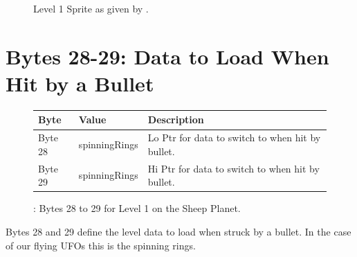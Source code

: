 \begin{figure}[H]
  {
    \setlength{\tabcolsep}{3.0pt}
    \setlength\cmidrulewidth{\heavyrulewidth} %
	\centering
	\def\MULTICOLORONE{white}
	\def\MULTICOLORTWO{red}
	\def\SPRITECOLOR{c64_purple}
	\begin{subfigure}{0.3\textwidth}
		
	\end{subfigure}
	\begin{subfigure}{0.3\textwidth}
		
	\end{subfigure}
	\begin{subfigure}{0.3\textwidth}
		
	\end{subfigure}
}\caption[position=top]{Level 1 Sprite as given by .}
\end{figure}

\section{Bytes 28-29: Data to Load When Hit by a Bullet}
\begin{figure}[H]

  {
    \setlength{\tabcolsep}{3.0pt}
    \setlength\cmidrulewidth{\heavyrulewidth} %
    \begin{adjustbox}{width=10cm,center}

      \begin{tabular}{lll}
        \toprule
        Byte    & Value                     & Description                                                        \\
        \midrule
 Byte 28 & spinningRings\index{spinningRings}             & Lo Ptr for data to switch to when hit by bullet.                                    \\
 Byte 29 & spinningRings\index{spinningRings}             & Hi Ptr for data to switch to when hit by bullet.                                    \\
        \bottomrule
      \end{tabular}
    \end{adjustbox}
  }\caption{: Bytes 28 to 29 for Level 1 on the Sheep Planet.}
\end{figure}

Bytes 28 and 29 define the level data to load when struck by a bullet. In the case of our
flying UFOs this is the spinning rings.

